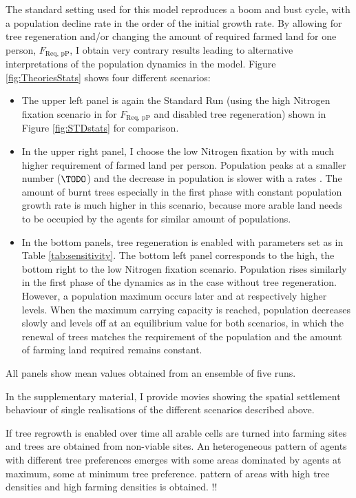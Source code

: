 The standard setting used for this model reproduces a boom and bust cycle, with a population decline rate in the order of the initial growth rate.
By allowing for tree regeneration and/or changing the amount of required farmed land for one person, $F_\text{Req, pP}$, I obtain very contrary results leading to alternative interpretations of the population dynamics in the model.
Figure \ref{fig:TheoriesStats} shows four different scenarios:
\begin{itemize}
	\item The upper left panel is again the Standard Run (using the high Nitrogen fixation scenario in \citet{Puleston2017} for $F_\text{Req, pP}$ and disabled tree regeneration) shown in Figure \ref{fig:STDstats} for comparison.
	\item In the upper right panel, I choose the low Nitrogen fixation by  \citet{Puleston2017} with much higher requirement of farmed land per person.
	Population peaks at a smaller number ($\TODO$) and the decrease in population is slower with a rates \TODO.
	The amount of burnt trees especially in the first phase with constant population growth rate is much higher in this scenario, because more arable land needs to be occupied by the agents for similar amount of populations.
	\item In the bottom panels, tree regeneration is enabled with parameters set as in Table \ref{tab:sensitivity}. The bottom left panel corresponds to the high, the bottom right to the low Nitrogen fixation scenario.
	Population rises similarly in the first phase of the dynamics as in the case without tree regeneration. However, a population maximum occurs later and at respectively higher levels. When the maximum carrying capacity is reached, population decreases slowly and levels off at an equilibrium value for both scenarios, in which the renewal of trees matches the requirement of the population and the amount of farming land required remains constant.
\end{itemize}
All panels show mean values obtained from an ensemble of five runs.

In the supplementary material, I provide movies showing the spatial settlement behaviour of single realisations of the different scenarios described above.

If tree regrowth is enabled over time all arable cells are turned into farming sites and trees are obtained from non-viable sites.
An heterogeneous pattern of agents with different tree preferences emerges with some areas dominated by agents at maximum, some at minimum tree preference.
 pattern of areas with high tree densities and high farming densities is obtained. 
\TODO!!


